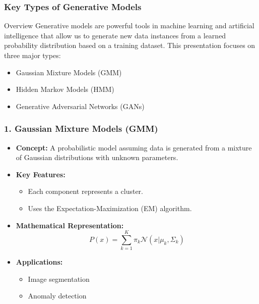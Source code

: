 \documentclass[aspectratio=169]{beamer}
\begin{document}
\begin{frame}[fragile]
    \frametitle{Key Types of Generative Models}
    \begin{block}{Overview}
        Generative models are powerful tools in machine learning and artificial intelligence that allow us to generate new data instances from a learned probability distribution based on a training dataset. This presentation focuses on three major types: 
        \begin{itemize}
            \item Gaussian Mixture Models (GMM)
            \item Hidden Markov Models (HMM)
            \item Generative Adversarial Networks (GANs)
        \end{itemize}
    \end{block}
\end{frame}

\begin{frame}[fragile]
    \frametitle{1. Gaussian Mixture Models (GMM)}
    \begin{itemize}
        \item \textbf{Concept:} A probabilistic model assuming data is generated from a mixture of Gaussian distributions with unknown parameters.
        \item \textbf{Key Features:}
        \begin{itemize}
            \item Each component represents a cluster.
            \item Uses the Expectation-Maximization (EM) algorithm.
        \end{itemize}
        \item \textbf{Mathematical Representation:}
        \begin{equation}
            P(x) = \sum_{k=1}^{K} \pi_k \mathcal{N}(x | \mu_k, \Sigma_k)
        \end{equation}
        \item \textbf{Applications:}
        \begin{itemize}
            \item Image segmentation
            \item Anomaly detection
        \end{itemize}
    \end{itemize}
\end{frame}
\end{document}
